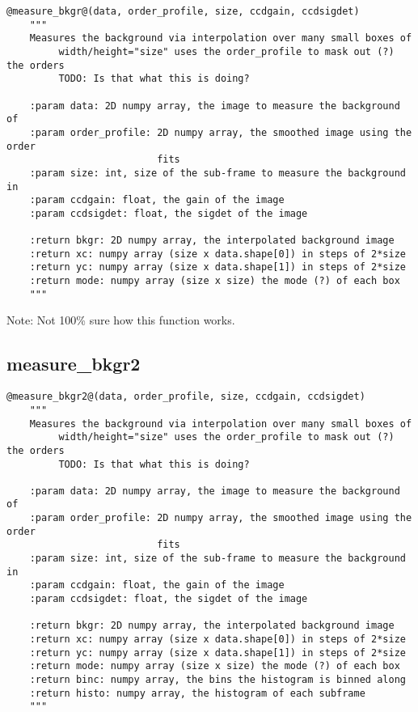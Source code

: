 \begin{lstlisting}[style=pythonstyle]
@measure_bkgr@(data, order_profile, size, ccdgain, ccdsigdet)
    """
    Measures the background via interpolation over many small boxes of
         width/height="size" uses the order_profile to mask out (?) the orders
         TODO: Is that what this is doing?

    :param data: 2D numpy array, the image to measure the background of
    :param order_profile: 2D numpy array, the smoothed image using the order
                          fits
    :param size: int, size of the sub-frame to measure the background in
    :param ccdgain: float, the gain of the image
    :param ccdsigdet: float, the sigdet of the image

    :return bkgr: 2D numpy array, the interpolated background image
    :return xc: numpy array (size x data.shape[0]) in steps of 2*size
    :return yc: numpy array (size x data.shape[1]) in steps of 2*size
    :return mode: numpy array (size x size) the mode (?) of each box
    """
\end{lstlisting}

\noindent Note: Not 100\% sure how this function works. \\

\subsection{measure\_bkgr2}

\begin{lstlisting}[style=pythonstyle]
@measure_bkgr2@(data, order_profile, size, ccdgain, ccdsigdet)
    """
    Measures the background via interpolation over many small boxes of
         width/height="size" uses the order_profile to mask out (?) the orders
         TODO: Is that what this is doing?

    :param data: 2D numpy array, the image to measure the background of
    :param order_profile: 2D numpy array, the smoothed image using the order
                          fits
    :param size: int, size of the sub-frame to measure the background in
    :param ccdgain: float, the gain of the image
    :param ccdsigdet: float, the sigdet of the image

    :return bkgr: 2D numpy array, the interpolated background image
    :return xc: numpy array (size x data.shape[0]) in steps of 2*size
    :return yc: numpy array (size x data.shape[1]) in steps of 2*size
    :return mode: numpy array (size x size) the mode (?) of each box
    :return binc: numpy array, the bins the histogram is binned along
    :return histo: numpy array, the histogram of each subframe
    """
\end{lstlisting}

